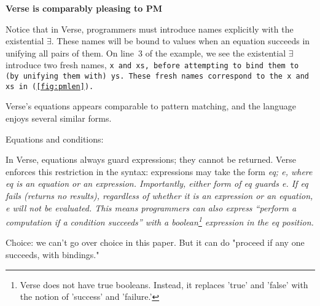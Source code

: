 \documentclass[manuscript,screen,review, 12pt]{acmart}
\begin{document}
\begin{outline}[enumerate]
    \1 \bf{\bf{Verse is comparably pleasing to PM}} 
    



    
    
    
    Notice that in Verse, programmers must introduce names explicitly with the
    existential $\exists$. These names will be bound to values when an equation
    succeeds in unifying all pairs of them. On line~3 of the example, we see the
    existential $\exists$ introduce two fresh names, \tt{x} and \tt{xs}, before
    attempting to bind them to (by unifying them with) \tt{ys}. These fresh
    names correspond to the \tt{x} and \tt{xs} in (\cref{fig:pmlen}). 

    Verse's equations appears comparable to pattern matching, and the language
    enjoys several similar forms. 

    \2 Equations and conditions: 

    In Verse, equations always guard expressions; they cannot be returned. Verse
    enforces this restriction in the syntax: expressions may take the form
    \it{eq; e}, where \it{eq} is an equation or an expression. Importantly,
    either form of \it{eq} guards {e}. If \it{eq} fails (returns no results),
    regardless of whether it is an expression or an equation, \it{e} will not be
    evaluated. This means programmers can also express “perform a computation if
    a condition succeeds” with a boolean\footnote{Verse does not have true
    booleans. Instead, it replaces 'true' and 'false' with the notion of
    'success' and 'failure.'} expression in the \it{eq} position. 

    \2 Choice: we can't go over choice in this paper. But it can do "proceed if
    any one succeeds, with bindings." 







\end{outline}
\end{document}
